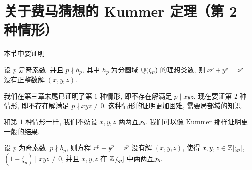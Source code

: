 \section{关于费马猜想的 Kummer 定理（第 2 种情形）}\label{sec:ch9-s1}

本节中要证明

\begin{theorem}\label{thm:9.1}
设 $p$ 是奇素数, 并且 $p\nmid h_p$, 其中 $h_p$ 为分圆域 $\mathbb{Q}(\zeta_p)$ 的理想类数, 则 $x^p+y^p=z^p$ 没有正整数解 $(x,y,z)$.
\end{theorem}

我们在第三章末尾已证明了第 $1$ 种情形, 即不存在解满足 $p\mid xyz$. 现在要证第 $2$ 种情形, 即不存在解满足 $p\nmid xyz\neq 0$. 这种情形的证明更加困难, 需要局部域的知识.

和第 $1$ 种情形一样, 我们不妨设 $x,y,z$ 两两互素. 我们可以像 Kummer 那样证明更一般的结果.

\begin{theorem}\label{thm:9.2}
设 $p$ 为奇素数, $p\nmid h_p$, 则方程 $x^p+y^p=z^p$ 没有解 $(x,y,z)$, 使得 $x,y,z\in\mathbb{Z}[\zeta_p]$, $(1-\zeta_p)\mid xyz\neq 0$, 并且 $x,y,z$ 在 $\mathbb{Z}[\zeta_p]$ 中两两互素.
\end{theorem}

